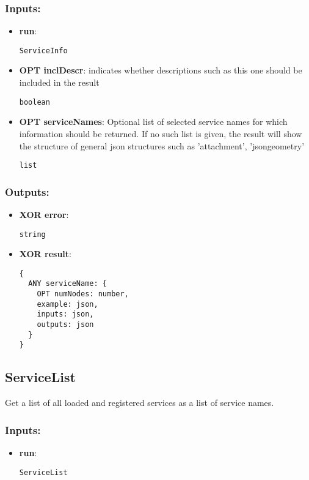 \subsubsection*{Inputs:}
\begin{itemize}
    \item \textbf{run}: 
\begin{lstlisting}
ServiceInfo
\end{lstlisting}
    \item \textbf{OPT inclDescr}: indicates whether descriptions such as this one should be included in the result
\begin{lstlisting}
boolean
\end{lstlisting}
    \item \textbf{OPT serviceNames}: Optional list of selected service names for which information should  be returned. If no such list is given, the result will show the  structure of general json structures such as 'attachment',  'jsongeometry'
\begin{lstlisting}
list
\end{lstlisting}
  \end{itemize}

\subsubsection*{Outputs:}
\begin{itemize}
    \item \textbf{XOR error}: 
\begin{lstlisting}
string
\end{lstlisting}
    \item \textbf{XOR result}: 
\begin{lstlisting}
{
  ANY serviceName: {
    OPT numNodes: number, 
    example: json, 
    inputs: json, 
    outputs: json
  }
}
\end{lstlisting}
  \end{itemize}

\subsection{ServiceList}
\label{ch:builtinservices:ServiceList}
Get a list of all loaded and registered services as a list of service names.
\subsubsection*{Inputs:}
\begin{itemize}
    \item \textbf{run}: 
\begin{lstlisting}
ServiceList
\end{lstlisting}
  \end{itemize}

